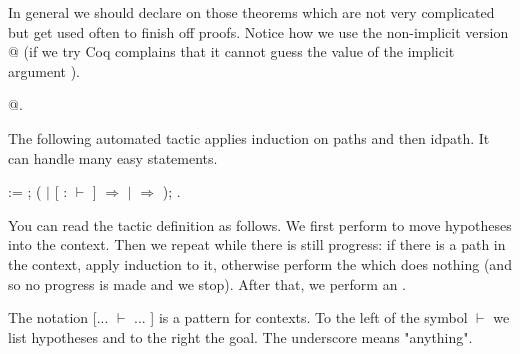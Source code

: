\documentclass[12pt]{report}
\begin{document}
   In general we should declare   on those theorems which
   are not very complicated but get used often to finish off
   proofs. Notice how we use the non-implicit version @ (if we
   try    Coq complains that it cannot guess the
   value of the implicit argument ).  \begin{coqdoccode}
\coqdocemptyline
\coqdocnoindent
{}  @.\coqdoceol
\coqdocemptyline
\end{coqdoccode}
The following automated tactic applies induction on paths and then
    idpath. It can handle many easy statements.  \begin{coqdoccode}
\coqdocemptyline
\coqdocnoindent
{}  :=\coqdoceol
\coqdocindent{1.00em}
;   (\coqdoceol
\coqdocindent{2.00em}
  \coqdoceol
\coqdocindent{3.00em}
\ensuremath{|} [  : \coqdocvar{\_}  \coqdocvar{\_}  \ensuremath{\vdash} \coqdocvar{\_} ] \ensuremath{\Rightarrow}  \coqdoceol
\coqdocindent{3.00em}
\ensuremath{|} \coqdocvar{\_} \ensuremath{\Rightarrow} \coqdoceol
\coqdocindent{2.00em}
\coqdoceol
\coqdocindent{1.00em}
); .\coqdoceol
\coqdocemptyline
\end{coqdoccode}
You can read the tactic definition as follows. We first perform
    to move hypotheses into the context. Then we repeat while
   there is still progress: if there is a path  in the context,
   apply induction to it, otherwise perform the  which does
   nothing (and so no progress is made and we stop). After that, we
   perform an .


   The notation  [... \ensuremath{\vdash} ... ]  is a pattern for contexts. To the
   left of the symbol \ensuremath{\vdash} we list hypotheses and to the right the
   goal. The underscore means "anything".
\end{document}
